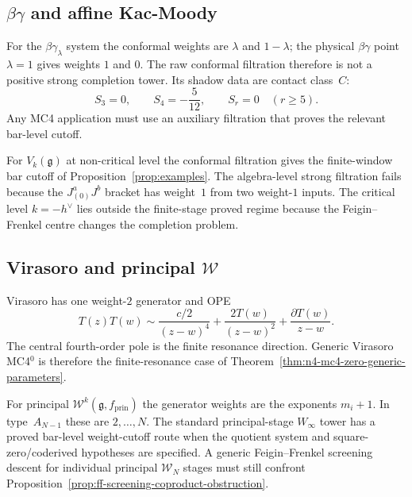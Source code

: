 \documentclass[11pt,reqno]{amsart}
\theoremstyle{definition}
\theoremstyle{remark}
\newcommand{\cW}{\mathcal{W}}
\newcommand{\fg}{\mathfrak{g}}
\numberwithin{equation}{section}
\begin{document}
\subsection{$\beta\gamma$ and affine Kac-Moody}

For the $\beta\gamma_\lambda$ system the conformal weights are
$\lambda$ and $1-\lambda$; the physical $\beta\gamma$ point
$\lambda=1$ gives weights $1$ and $0$. The raw conformal filtration
therefore is not a positive strong completion tower. Its shadow
data are contact class~$C$:
\[
S_3=0,\qquad S_4=-\frac{5}{12},\qquad S_r=0\quad(r\ge 5).
\]
Any MC4 application must use an auxiliary filtration that proves
the relevant bar-level cutoff.

For $V_k(\fg)$ at non-critical level the conformal filtration gives
the finite-window bar cutoff of Proposition~\ref{prop:examples}.
The algebra-level strong filtration fails because the
$J^a_{(0)}J^b$ bracket has weight~$1$ from two weight-$1$ inputs.
The critical
level $k=-h^\vee$ lies outside the finite-stage proved regime
because the Feigin--Frenkel centre changes the completion problem.

\subsection{Virasoro and principal $\cW$}

Virasoro has one weight-$2$ generator and OPE
\[
T(z)T(w)\sim\frac{c/2}{(z-w)^4}
+\frac{2T(w)}{(z-w)^2}
+\frac{\partial T(w)}{z-w}.
\]
The central fourth-order pole is the finite resonance direction.
Generic Virasoro MC4${}^0$ is therefore the finite-resonance
case of Theorem~\ref{thm:n4-mc4-zero-generic-parameters}.

For principal $\cW^k(\fg,f_{\mathrm{prin}})$ the generator weights
are the exponents $m_i+1$. In type~$A_{N-1}$ these are
$2,\ldots,N$. The standard principal-stage $W_\infty$ tower has a
proved bar-level weight-cutoff route when the quotient system and
square-zero/coderived hypotheses are specified. A generic
Feigin--Frenkel screening descent for individual principal
$\cW_N$ stages must still confront
Proposition~\ref{prop:ff-screening-coproduct-obstruction}.
\end{document}
